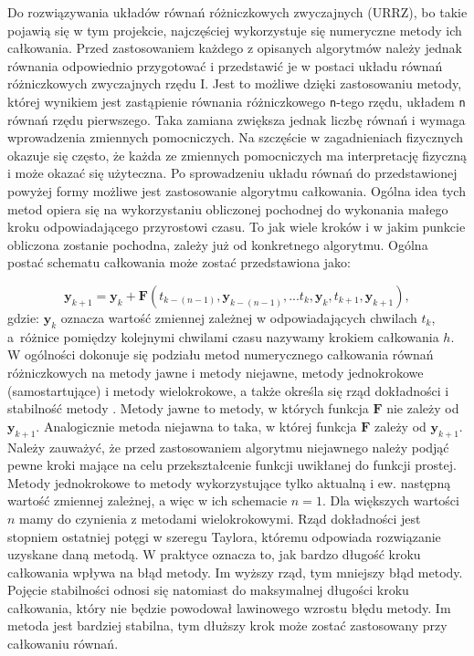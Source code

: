 Do rozwiązywania układów równań różniczkowych zwyczajnych (URRZ), bo takie pojawią się w tym projekcie, najczęściej wykorzystuje się numeryczne metody ich całkowania. Przed zastosowaniem każdego z opisanych algorytmów należy jednak równania odpowiednio przygotować i przedstawić je w postaci układu równań różniczkowych zwyczajnych rzędu I. Jest to możliwe dzięki zastosowaniu metody, której wynikiem jest zastąpienie równania różniczkowego \texttt{n}-tego rzędu, układem \texttt{n} równań rzędu pierwszego. Taka zamiana zwiększa jednak liczbę równań i wymaga wprowadzenia zmiennych pomocniczych. Na szczęście w zagadnieniach fizycznych okazuje się często, że każda ze zmiennych pomocniczych ma interpretację fizyczną i może okazać się użyteczna. Po sprowadzeniu układu równań do przedstawionej powyżej formy możliwe jest zastosowanie algorytmu całkowania. Ogólna idea tych metod opiera się na wykorzystaniu obliczonej pochodnej do wykonania małego kroku odpowiadającego przyrostowi czasu. To jak wiele kroków i w jakim punkcie obliczona zostanie pochodna, zależy już od konkretnego algorytmu.
Ogólna postać schematu całkowania może zostać przedstawiona jako:

\[
	\bm{y}_{k+1} = \bm{y}_{k} + \bm{F} \left( t_{k-(n-1)}, \bm{y}_{k-(n-1)}, ... t_{k}, \bm{y}_{k},  t_{k+1}, \bm{y}_{k+1}  \right),
\]
gdzie: $\bm{y}_{k}$ oznacza wartość zmiennej zależnej w odpowiadających chwilach $t_{k}$, a~różnice pomiędzy kolejnymi chwilami czasu nazywamy krokiem całkowania $h$.
\\

W ogólności dokonuje się podziału metod numerycznego całkowania równań różniczkowych na metody jawne i metody niejawne, metody jednokrokowe (samostartujące) i metody wielokrokowe, a także określa się rząd dokładności i stabilność metody \cite{met_num_szum}. Metody jawne to metody, w których funkcja $\bm{F}$ nie zależy od $\bm{y}_{k+1}$. Analogicznie metoda niejawna to taka, w której funkcja $\bm{F}$ zależy od $\bm{y}_{k+1}$. Należy zauważyć, że przed zastosowaniem algorytmu niejawnego należy podjąć pewne kroki mające na celu przekształcenie funkcji uwikłanej do funkcji prostej. Metody jednokrokowe to metody wykorzystujące tylko aktualną i ew. następną wartość zmiennej zależnej, a więc w ich schemacie $n = 1$. Dla większych wartości $n$ mamy do czynienia z metodami wielokrokowymi. Rząd dokładności jest stopniem ostatniej potęgi w szeregu Taylora, któremu odpowiada rozwiązanie uzyskane daną metodą. W praktyce oznacza to, jak bardzo długość kroku całkowania wpływa na błąd metody. Im wyższy rząd, tym mniejszy błąd metody. Pojęcie stabilności odnosi się natomiast do maksymalnej długości kroku całkowania, który nie będzie powodował lawinowego wzrostu błędu metody. Im metoda jest bardziej stabilna, tym dłuższy krok może zostać zastosowany przy całkowaniu równań.\\

